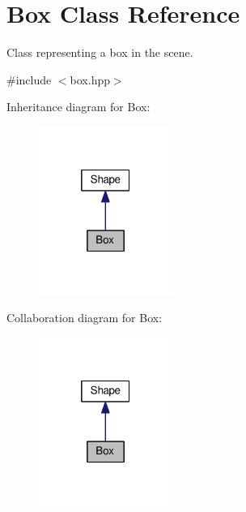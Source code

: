 \hypertarget{class_box}{}\section{Box Class Reference}
\label{class_box}


Class representing a box in the scene.  




{\ttfamily \#include $<$box.\+hpp$>$}



Inheritance diagram for Box\+:
\nopagebreak
\begin{figure}[H]
\begin{center}
\leavevmode
\includegraphics[width=124pt]{class_box__inherit__graph}
\end{center}
\end{figure}


Collaboration diagram for Box\+:
\nopagebreak
\begin{figure}[H]
\begin{center}
\leavevmode
\includegraphics[width=124pt]{class_box__coll__graph}
\end{center}
\end{figure}
